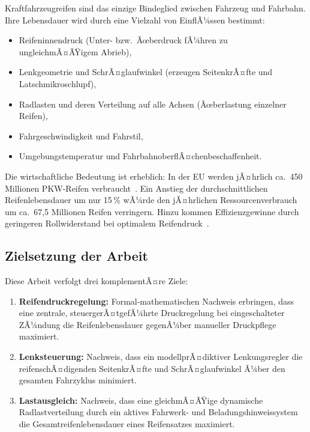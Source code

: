 ﻿\documentclass[12pt,a4paper]{article}
\theoremstyle{definition}
\theoremstyle{remark}
\begin{document}
Kraftfahrzeugreifen sind das einzige Bindeglied zwischen Fahrzeug und Fahrbahn.
Ihre Lebensdauer wird durch eine Vielzahl von EinflÃ¼ssen bestimmt:

\begin{itemize}[nosep]
  \item Reifeninnendruck (Unter- bzw.\ Ãœberdruck fÃ¼hren zu ungleichmÃ¤ÃŸigem Abrieb),
  \item Lenkgeometrie und SchrÃ¤glaufwinkel (erzeugen SeitenkrÃ¤fte und Latschmikroschlupf),
  \item Radlasten und deren Verteilung auf alle Achsen (Ãœberlastung einzelner Reifen),
  \item Fahrgeschwindigkeit und Fahrstil,
  \item Umgebungstemperatur und FahrbahnoberflÃ¤chenbeschaffenheit.
\end{itemize}

Die wirtschaftliche Bedeutung ist erheblich: In der EU werden jÃ¤hrlich ca.\ 450
Millionen PKW-Reifen verbraucht~\cite{ETRMA2023}. Ein Anstieg der durchschnittlichen
Reifenlebensdauer um nur 15\,\% wÃ¼rde den jÃ¤hrlichen Ressourcenverbrauch um ca.\ 67,5
Millionen Reifen verringern. Hinzu kommen Effizienzgewinne durch geringeren Rollwiderstand
bei optimalem Reifendruck~\cite{Sandberg2011}.

\subsection{Zielsetzung der Arbeit}

Diese Arbeit verfolgt drei komplementÃ¤re Ziele:

\begin{enumerate}
  \item \textbf{Reifendruckregelung:} Formal-mathematischen Nachweis erbringen, dass
        eine zentrale, steuergerÃ¤tgefÃ¼hrte Druckregelung bei eingeschalteter ZÃ¼ndung
        die Reifenlebensdauer gegenÃ¼ber manueller Druckpflege maximiert.
  \item \textbf{Lenksteuerung:} Nachweis, dass ein modellprÃ¤diktiver Lenkungsregler
        die reifenschÃ¤digenden SeitenkrÃ¤fte und SchrÃ¤glaufwinkel Ã¼ber den gesamten
        Fahrzyklus minimiert.
  \item \textbf{Lastausgleich:} Nachweis, dass eine gleichmÃ¤ÃŸige dynamische Radlastverteilung
        durch ein aktives Fahrwerk- und Beladungshinweissystem die Gesamtreifenlebensdauer
        eines Reifensatzes maximiert.
\end{enumerate}
\end{document}

